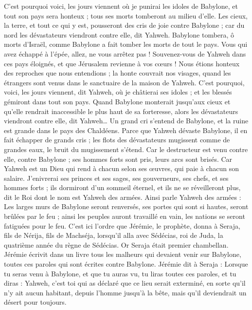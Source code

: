 \begin{multicols}{2}
C'est pourquoi voici, les jours viennent où je punirai les idoles de Babylone, et tout son pays sera honteux ; tous ses morts tomberont au milieu d'elle.
Les cieux, la terre, et tout ce qui y est, pousseront des cris de joie contre Babylone ; car du nord les dévastateurs viendront contre elle, dit Yahweh.
Babylone tombera, ô morts d'Israël, comme Babylone a fait tomber les morts de tout le pays.
Vous qui avez échappé à l'épée, allez, ne vous arrêtez pas ! Souvenez-vous de Yahweh dans ces pays éloignés, et que Jérusalem revienne à vos cœurs !
Nous étions honteux des reproches que nous entendions ; la honte couvrait nos visages, quand les étrangers sont venus dans le sanctuaire de la maison de Yahweh.
C'est pourquoi, voici, les jours viennent, dit Yahweh, où je châtierai ses idoles ; et les blessés gémiront dans tout son pays.
Quand Babylone monterait jusqu'aux cieux et qu'elle rendrait inaccessible le plus haut de sa forteresse, alors les dévastateurs viendront contre elle, dit Yahweh…
Un grand cri s'entend de Babylone, et la ruine est grande dans le pays des Chaldéens.
Parce que Yahweh dévaste Babylone, il en fait échapper de grands cris ; les flots des dévastateurs mugissent comme de grandes eaux, le bruit du mugissement s'étend.
Car le destructeur est venu contre elle, contre Babylone ; ses hommes forts sont pris, leurs arcs sont brisés. Car Yahweh est un Dieu qui rend à chacun selon ses œuvres, qui paie à chacun son salaire.
J'enivrerai ses princes et ses sages, ses gouverneurs, ses chefs, et ses hommes forts ; ils dormiront d'un sommeil éternel, et ils ne se réveilleront plus, dit le Roi dont le nom est Yahweh des armées.
Ainsi parle Yahweh des armées : Les larges murs de Babylone seront renversés, ses portes qui sont si hautes, seront brûlées par le feu ; ainsi les peuples auront travaillé en vain, les nations se seront fatiguées pour le feu.
C'est ici l'ordre que Jérémie, le prophète, donna à Seraja, fils de Nérija, fils de Machséja, lorsqu'il alla avec Sédécias, roi de Juda, la quatrième année du règne de Sédécias. Or Seraja était premier chambellan.
Jérémie écrivit dans un livre tous les malheurs qui devaient venir sur Babylone, toutes ces paroles qui sont écrites contre Babylone.
Jérémie dit à Seraja : Lorsque tu seras venu à Babylone, et que tu auras vu, tu liras toutes ces paroles,
et tu diras : Yahweh, c'est toi qui as déclaré que ce lieu serait exterminé, en sorte qu'il n'y ait aucun habitant, depuis l'homme jusqu'à la bête, mais qu'il deviendrait un désert pour toujours.

\end{multicols}
